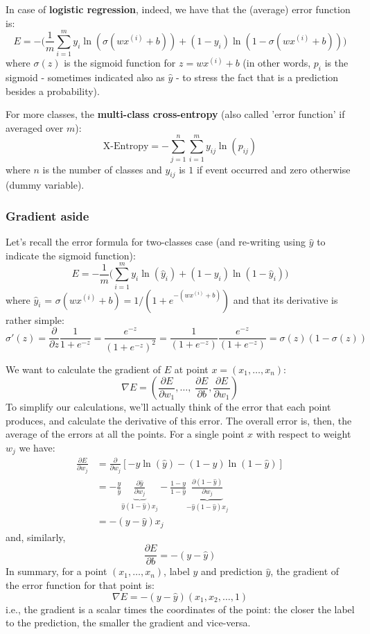 \documentclass[11pt]{article}
\begin{document}
In case of \textbf{logistic regression}, indeed, we have that the (average) error function is:
\[ E = -\big( \frac{1}{m} \sum_{i=1}^m y_i \ln(\sigma(w x^{(i)}+b)) + (1-y_i) \ln(1-\sigma(w x^{(i)}+b)) \big) 
\]  
where $\sigma(z)$ is the sigmoid function for  $z = w x^{(i)}+b$ (in other words, $p_i$ is the sigmoid - sometimes indicated also as $\hat{y}$ - to stress the fact that is a prediction besides a probability).

For more classes, the \textbf{multi-class cross-entropy} (also called 'error function' if averaged over $m$):
\[ \text{X-Entropy} =  -\sum_{j=1}^n \sum_{i=1}^m y_{ij} \ln(p_{ij})
\]
where $n$ is the number of classes and $y_{ij}$ is $1$ if event occurred and zero otherwise (dummy variable). 


\subsubsection*{Gradient aside}
Let's recall the error formula for two-classes case (and re-writing using $\hat{y}$ to indicate the sigmoid function):
\[ E = - \frac{1}{m} \big( \sum_{i=1}^m y_i \ln(\hat{y}_i) + (1-y_i) \ln(1-\hat{y}_i) \big)
\]  
where $\hat{y}_i$ = $\sigma(w x^{(i)}+b) = 1 / (1+e^{-(w x^{(i)}+b)}) $ and that its derivative is rather simple:
\[ \sigma'(z) = \frac{\partial}{\partial z} \frac{1}{1+e^{-z}} 
= \frac{e^{-z}}{(1+e^{-z})^2} =
\frac{1}{(1+e^{-z})} \frac{e^{-z}}{(1+e^{-z})} = \sigma(z) (1-\sigma(z))
\]

We want to calculate the gradient of $E$ at point $x=(x_1, \ldots, x_n)$:
\[ \nabla E = (\frac{\partial E}{\partial w_1}, \ldots, \; \frac{\partial E}{\partial b}, \frac{\partial E}{\partial w_1} )
\] 
To simplify our calculations, we'll actually think of the error that each point produces, and calculate the derivative of this error. The overall error is, then, the average of the errors at all the points. For a single point $x$ with respect to weight $w_j$ we have:
\begin{align*}
\frac{\partial E}{\partial w_j}  &= \frac{\partial}{\partial w_j} [ -y \ln(\hat{y}) - (1-y) \ln(1-\hat{y})] \\
&= -\frac{y}{\hat{y}} \underbrace{\frac{\partial \hat{y}}{\partial w_j}}_{\hat{y}(1-\hat{y})x_j}  - \frac{1-y}{1-\hat{y}} \underbrace{\frac{\partial (1-\hat{y})}{\partial w_j} }_{-\hat{y}(1-\hat{y})x_j} \\
&= -(y-\hat{y}) x_j
\end{align*}
and, similarly, 
\[\frac{\partial E}{\partial b} =  -(y-\hat{y}) 
\]
In summary, for a point $(x_1, \ldots, x_n)$, label $y$ and prediction $\hat{y}$,  the gradient of the error function for that point is:
\[ \nabla E = -(y-\hat{y})  (x_1, x_2, \ldots, 1)
\]
i.e., the gradient is a scalar times the coordinates of the point: the closer the label to the prediction, the smaller the gradient and vice-versa.
\end{document}
